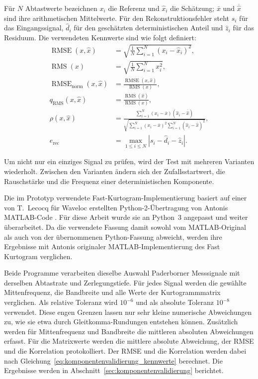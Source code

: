 \newpage
Für $N$ Abtastwerte bezeichnen $x_i$ die Referenz und $\hat{x}_i$ die
Schätzung; $\bar{x}$ und $\overline{\hat{x}}$ sind ihre arithmetischen
Mittelwerte. Für den Rekonstruktionsfehler steht $s_i$ für das Eingangssignal,
$\hat{d}_i$ für den geschätzten deterministischen Anteil und $\hat{z}_i$ für
das Residuum. Die verwendeten Kennwerte sind wie folgt definiert:
\begin{equation}
    \begin{aligned}
        \operatorname{RMSE}(x,\hat{x})
            &= \sqrt{\frac{1}{N}\sum_{i=1}^{N}(x_i-\hat{x}_i)^2}, \\
        \operatorname{RMS}(x)
            &= \sqrt{\frac{1}{N}\sum_{i=1}^{N}x_i^2}, \\
        \operatorname{RMSE}_{\mathrm{norm}}(x,\hat{x})
            &= \frac{\operatorname{RMSE}(x,\hat{x})}{\operatorname{RMS}(x)}, \\
        q_{\mathrm{RMS}}(x,\hat{x})
            &= \frac{\operatorname{RMS}(\hat{x})}{\operatorname{RMS}(x)}, \\
        \rho(x,\hat{x})
            &= \frac{\sum_{i=1}^{N}(x_i-\bar{x})(\hat{x}_i-\overline{\hat{x}})}
                    {\sqrt{\sum_{i=1}^{N}(x_i-\bar{x})^2
                    \sum_{i=1}^{N}(\hat{x}_i-\overline{\hat{x}})^2}}, \\
        e_{\mathrm{rec}}
            &= \max_{1\leq i\leq N}\left|s_i-\hat{d}_i-\hat{z}_i\right|.
    \end{aligned}
    \label{eq:komponentenvalidierung_kennwerte}
\end{equation}

Um nicht nur ein einziges Signal zu prüfen, wird der Test mit mehreren Varianten
wiederholt. Zwischen den Varianten ändern sich der Zufallsstartwert, die
Rauschstärke und die Frequenz einer deterministischen Komponente.

Die im Prototyp verwendete Fast-Kurtogram-Implementierung basiert auf einer von
T.~Lecocq für Waveloc erstellten Python-2-Übertragung von Antonis MATLAB-Code
\cite{lecocqFastKurtogram2012}.
Für diese Arbeit wurde sie an Python~3 angepasst und weiter überarbeitet. Da
die verwendete Fassung damit sowohl vom MATLAB-Original als auch von der
übernommenen Python-Fassung abweicht, werden ihre Ergebnisse mit Antonis
originaler MATLAB-Implementierung des Fast Kurtogram verglichen.

Beide Programme verarbeiten dieselbe Auswahl Paderborner Messsignale mit
derselben Abtastrate und Zerlegungstiefe. Für jedes Signal werden die gewählte
Mittenfrequenz, die Bandbreite und alle Werte der Kurtogrammmatrix verglichen.
Als relative Toleranz wird $10^{-6}$ und als absolute Toleranz $10^{-8}$
verwendet. Diese engen Grenzen lassen nur sehr kleine numerische Abweichungen
zu, wie sie etwa durch Gleitkomma-Rundungen entstehen können. Zusätzlich werden
für Mittenfrequenz und Bandbreite die mittleren
absoluten Abweichungen erfasst. Für die Matrixwerte werden die mittlere absolute
Abweichung, der \gls{RMSE} und die Korrelation protokolliert. Der \gls{RMSE}
und die Korrelation werden dabei nach
Gleichung~\eqref{eq:komponentenvalidierung_kennwerte} berechnet. Die Ergebnisse
werden in Abschnitt~\ref{sec:komponentenvalidierung} berichtet.

